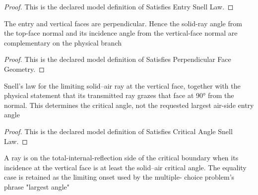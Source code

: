 \begin{proof}
  This is the declared model definition of Satisfies Entry Snell Law.
\end{proof}
\begin{definition}
  \label{def:physics:phyx-mini-0096:phyxminiproblems-problemphyxmini0096-satisfiesperpendicularfacegeometry}
  The entry and vertical faces are perpendicular. Hence the solid-ray angle from the top-face normal and its incidence angle from the vertical-face normal are complementary on the physical branch
\end{definition}
\begin{proof}
  This is the declared model definition of Satisfies Perpendicular Face Geometry.
\end{proof}
\begin{definition}
  \label{def:physics:phyx-mini-0096:phyxminiproblems-problemphyxmini0096-satisfiescriticalanglesnelllaw}
  Snell's law for the limiting solid--air ray at the vertical face, together with the physical statement that its transmitted ray grazes that face at 90° from the normal. This determines the critical angle, not the requested largest air-side entry angle
\end{definition}
\begin{proof}
  This is the declared model definition of Satisfies Critical Angle Snell Law.
\end{proof}
\begin{definition}
  \label{def:physics:phyx-mini-0096:phyxminiproblems-problemphyxmini0096-undergoestotalinternalreflectionata}
  A ray is on the total-internal-reflection side of the critical boundary when its incidence at the vertical face is at least the solid--air critical angle. The equality case is retained as the limiting onset used by the multiple- choice problem's phrase "largest angle"
\end{definition}
